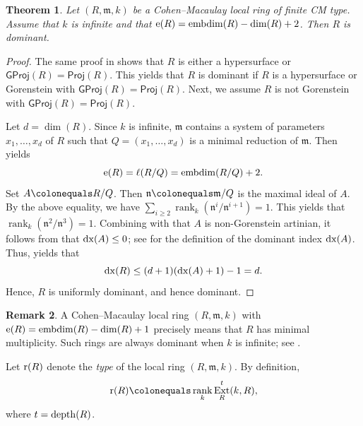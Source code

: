 \documentclass{amsart}
\DeclareMathOperator{\rank}{rank}
\DeclareMathOperator{\embdim}{embdim}
\newcommand{\n}{\mathfrak{n}}
\newcommand{\0}{{\bf{0}}}
\newcommand{\m}{\mathfrak{m}}
\DeclareMathOperator{\Ext}{Ext}
\newcommand{\Proj}{\mathsf{Proj}}
\newcommand{\GProj}{\mathsf{GProj}}
\newtheorem{theorem}{Theorem}[section]
\theoremstyle{definition}
\newtheorem{remark}[theorem]{Remark}
\begin{document}
\begin{theorem}\label{support}
    Let $(R,\m,k)$ be a Cohen--Macaulay local ring of finite CM type. Assume that $k$ is infinite and that ${\rm e}(R)=\embdim(R)-\dim(R)+2$. Then $R$ is dominant. 
\end{theorem}
\begin{proof}
The same proof in  shows that $R$ is either a hypersurface or $\GProj(R)=\Proj(R)$. This yields that $R$ is dominant if $R$ is a hypersurface or Gorenstein with $\GProj(R)=\Proj(R)$. Next, we assume $R$ is not Gorenstein with $\GProj(R)=\Proj(R)$. 

   Let $d=\dim(R)$. Since $k$ is infinite, $\m$ contains a system of parameters $x_1,\ldots,x_d$ of $R$ such that $Q=(x_1,\ldots,x_d)$ is a minimal reduction of $\m$. Then  yields  
   $$
   {\rm e}(R)=\ell(R/Q)=\embdim(R/Q)+2. 
   $$
   Set $A\colonequals R/Q$. Then $\n\colonequals \m/Q$ is the maximal ideal of $A$. By the above equality, we have $\sum_{i\geq 2}\rank_k(\n^i/\n^{i+1})=1$. This yields that $\rank_k(\n^2/\n^3)=1$. Combining with that $A$ is non-Gorenstein artinian, it follows from \cite[Proposition 6.3(1)(c)]{KT2026} that ${\rm dx}(A)\leq 0$; see  for the definition of the dominant index ${\rm dx}(A)$. Thus, \cite[Lemma 6.1(3)]{KT2026} yields that
   $$
   {\rm dx}(R)\leq (d+1)({\rm dx}(A)+1)-1=d.
   $$
   Hence, $R$ is uniformly dominant, and hence dominant. 
\end{proof}
\begin{remark}
A Cohen--Macaulay local ring $(R,\m,k)$ with ${\rm e}(R)=\embdim(R)-\dim(R)+1$ precisely means that $R$ has minimal multiplicity. Such rings are always dominant when $k$ is infinite; see .
\end{remark}
Let ${\rm r}(R)$ denote the \emph{type} of the local ring $(R,\m,k)$. By definition,
\[
{\rm r}(R)\colonequals \rank_k\Ext^t_R(k,R),
\]
where $t=\operatorname{depth}(R)$.
\end{document}
